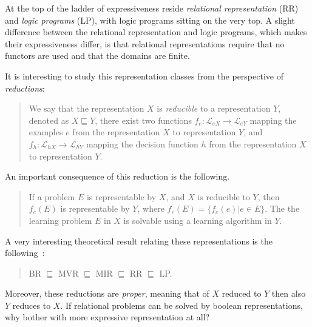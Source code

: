 At the top of the ladder of expressiveness reside \textit{relational representation} (RR) and \textit{logic programs} (LP), with logic programs sitting on the very top.
A slight difference between the relational representation and logic programs, which makes their expressiveness differ, is that relational representations require that no functors are used and that the domains are finite.



It is interesting to study this representation classes from the perspective of \textit{reductions}:

\begin{quote}
	We say that the representation $X$ is \textit{reducible} to a representation $Y$, denoted as $X \sqsubseteq Y$, there exist two functions $f_e: \mathcal{L}_{eX} \rightarrow \mathcal{L}_{eY}$ mapping the examples $e$ from the representation $X$ to representation $Y$, and $f_h: \mathcal{L}_{hX} \rightarrow \mathcal{L}_{hY}$ mapping the decision function $h$ from the representation $X$ to representation $Y$.
\end{quote}


An important consequence of this reduction is the following.

\begin{quote}
	If a problem $E$ is representable by $X$, and $X$ is reducible to $Y$, then $f_e(E)$ is representable by $Y$, where $f_e(E) = \{ f_e(e) | e \in E\}$. The the learning problem $E$ in $X$ is solvable using a learning algorithm in $Y$.
\end{quote}



A very interesting theoretical result relating these representations is the following~\cite{10.1007/BFb0027304}:

\begin{quote}
	BR $\sqsubseteq$ MVR $\sqsubseteq$ MIR $\sqsubseteq$ RR $\sqsubseteq$ LP.
\end{quote}


Moreover, these reductions are \textit{proper}, meaning that of $X$ reduced to $Y$ then also $Y$ reduces to $X$.
If relational problems can be solved by boolean representations,  why bother with more expressive representation at all?


